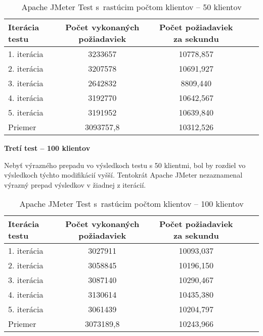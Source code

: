 \documentclass[12pt,oneside,final]{fithesis-utf8}
\begin{document}
\begin{itemize}
\begin{table}[H]
\begin{center}
\begin{tabular}{ | l | c | c | c | c |}
		\hline
		 \textbf{Iterácia testu} & \textbf{Počet vykonaných požiadaviek} & \textbf{Počet požiadaviek za sekundu} \\ \hline
		 1. iterácia & 3233657 & 10778,857 \\ \hline
		 2. iterácia & 3207578 & 10691,927 \\ \hline
		 3. iterácia & 2642832 & 8809,440 \\ \hline
		 4. iterácia & 3192770 & 10642,567 \\ \hline
		 5. iterácia & 3191952 & 10639,840 \\ \hline
		 Priemer & 3093757,8 & 10312,526 \\ \hline
		 
\end{tabular}
\end{center}
\caption{Apache JMeter Test s~rastúcim počtom klientov -- 50 klientov}
\end{table}


\textbf{Tretí test -- 100 klientov}

Nebyť výrazného prepadu vo výsledkoch testu s 50 klientmi, bol by rozdiel vo výsledkoch týchto modifikácií vyšší. Tentokrát Apache JMeter nezaznamenal výrazný prepad výsledkov v žiadnej z iterácií.

\begin{table}[H]
\begin{center}
\begin{tabular}{ | l | c | c | c | c |}
		\hline
		 \textbf{Iterácia testu} & \textbf{Počet vykonaných požiadaviek} & \textbf{Počet požiadaviek za sekundu} \\ \hline
		 1. iterácia & 3027911 & 10093,037 \\ \hline
		 2. iterácia & 3058845 & 10196,150 \\ \hline
		 3. iterácia & 3087140 & 10290,467 \\ \hline
		 4. iterácia & 3130614 & 10435,380 \\ \hline
		 5. iterácia & 3061439 & 10204,797 \\ \hline
		 Priemer & 3073189,8 & 10243,966 \\ \hline
		 
\end{tabular}
\end{center}
\caption{Apache JMeter Test s~rastúcim počtom klientov -- 100 klientov}
\end{table}



\end{itemize}
\end{document}
